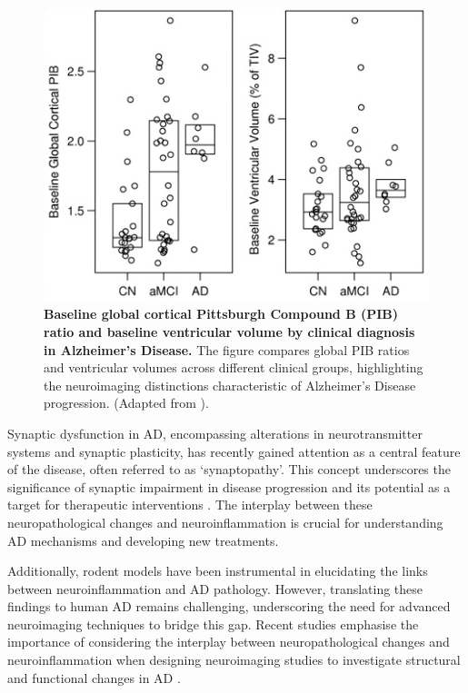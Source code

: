 \documentclass[10pt]{article}
\begin{document}
\begin{sloppypar}
  \begin{figure}[ht]
    \centering
    \includegraphics[width=\textwidth]{figures/pib-ratio.png}
    \caption[Baseline global cortical Pittsburgh Compound B (PIB) ratio and baseline ventricular volume by clinical diagnosis in Alzheimer’s Disease.]{\textbf{Baseline global cortical Pittsburgh Compound B (PIB) ratio and baseline ventricular volume by clinical diagnosis in Alzheimer’s Disease.} The figure compares global PIB ratios and ventricular volumes across different clinical groups, highlighting the neuroimaging distinctions characteristic of Alzheimer’s Disease progression. (Adapted from \cite{jack_serial_2009}).}
    \label{fig:pib-ratio}
  \end{figure}

  Synaptic dysfunction in AD, encompassing alterations in neurotransmitter systems and synaptic plasticity, has recently gained attention as a central feature of the disease, often referred to as ‘synaptopathy’. This concept underscores the significance of synaptic impairment in disease progression and its potential as a target for therapeutic interventions \citep{meftah_alzheimers_2023}. The interplay between these neuropathological changes and neuroinflammation is crucial for understanding AD mechanisms and developing new treatments.

  Additionally, rodent models have been instrumental in elucidating the links between neuroinflammation and AD pathology. However, translating these findings to human AD remains challenging, underscoring the need for advanced neuroimaging techniques to bridge this gap. Recent studies emphasise the importance of considering the interplay between neuropathological changes and neuroinflammation when designing neuroimaging studies to investigate structural and functional changes in AD \citep{nazem_rodent_2015}.


\end{sloppypar}
\end{document}
